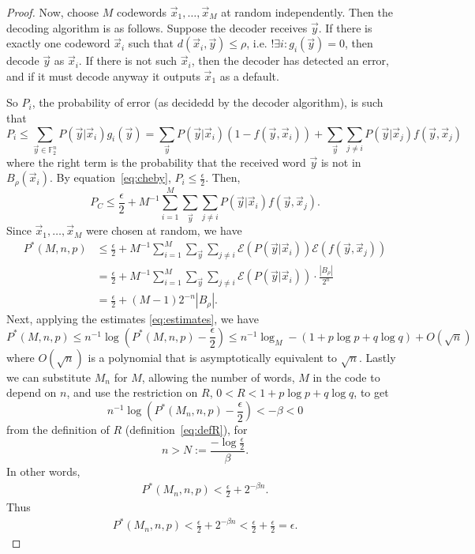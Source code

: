 \documentclass{article}
\newcommand{\F}{\mathbb{F}}
\newcommand{\E}{\mathcal{E}}
\renewcommand{\=}{\equiv}
\renewcommand{\i}{^{-1}}
\renewcommand{\v}{\vec}
\newcommand{\x}{{\v x}}
\newcommand{\y}{{\v y}}
\theoremstyle{plain}
\theoremstyle{definition}
\begin{document}
\begin{proof}
Now, choose $M$ codewords $\x_1, \dots, \x_M$ at random independently.
Then the decoding algorithm is as follows.
Suppose the decoder receives $\y$.
If there is exactly one codeword $\x_i$ such that $d(\x_i, \y) \leq \rho$, i.e. $!\exists i : g_i(\y) = 0$, then decode $\y$ as $\x_i$.
If there is not such $\x_i$, then the decoder has detected an error, and if it must decode anyway it outputs $\x_1$ as a default.

So $P_i$, the probability of error (as decidedd by the decoder algorithm), is such that
$$
  P_i
  \leq \sum_{\y \in \F_2^n} P(\y|\x_i) g_i(\y)
  = \sum_{\y} P(\y|\x_i)(1 - f(\y, \x_i)) + \sum_{\y} \sum_{j \neq i} P(\y|\x_j) f(\y, \x_j)
$$
where the right term is the probability that the received word $\y$ is not in $B_\rho(\x_i)$.
By equation~\ref{eq:cheby}, $P_i \leq \frac{\epsilon}{2}$.
Then,
$$ P_C \leq \frac{\epsilon}{2} + M\i \sum_{i = 1}^M \sum_{\y} \sum_{j \neq i} P(\y|\x_i) f(\y, \x_j). $$
Since $\x_1, \dots, \x_M$ were chosen at random, we have
\begin{align*}
  P^*(M, n, p)
  &\leq \frac{\epsilon}{2} + M\i \sum_{i = 1}^M \sum_{\y} \sum_{j \neq i} \E(P(\y|\x_i)) \E(f(\y, \x_j)) \\
  &= \frac{\epsilon}{2} + M\i \sum_{i = 1}^M \sum_{\y} \sum_{j \neq i} \E(P(\y|\x_i)) \cdot \frac{|B_\rho|}{2^n} \\
  &= \frac{\epsilon}{2} + (M - 1)2^{-n} |B_\rho|.
\end{align*}
Next, applying the estimates \ref{eq:estimates}, we have
$$ P^*(M, n, p) \leq n\i \log(P^*(M,n,p) - \frac{\epsilon}{2}) \leq n\i \log_M - (1 + p \log p + q \log q) + O(\sqrt{n}) $$
where $O(\sqrt{n})$ is a polynomial that is asymptotically equivalent to $\sqrt{n}$.
Lastly we can substitute $M_n$ for $M$, allowing the number of words, $M$ in the code to depend on $n$, and use the restriction on $R$, $0 < R < 1 + p \log p + q \log q$, to get
$$ n\i \log(P^*(M_n, n, p) - \frac{\epsilon}{2}) < - \beta < 0 $$
from the definition of $R$ (definition~\ref{eq:defR}), for $$n > N := \frac{-\log\frac{\epsilon}{2}}{\beta}.$$
In other words,
\begin{align*}
  P^*(M_n, n, p) < \frac{\epsilon}{2} + 2^{-\beta n}.
\end{align*}
Thus
\begin{align*}
  P^*(M_n, n, p)
  < \frac{\epsilon}{2} + 2^{-\beta n}
  < \frac{\epsilon}{2} + \frac{\epsilon}{2}
  = \epsilon.
\end{align*}
\end{proof}
\end{document}
